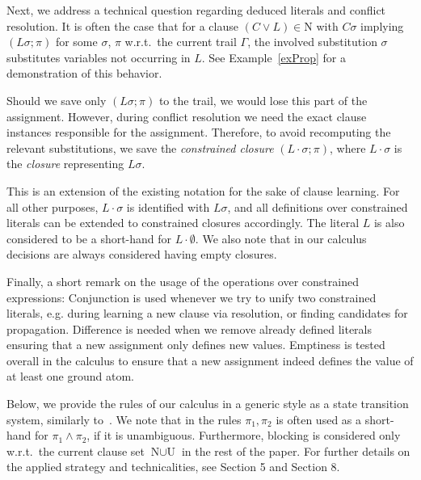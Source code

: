 \documentclass[a4paper]{article}
\begin{document}
Next, we address a technical question regarding deduced literals and conflict resolution. 
It is often the case that for a clause $(C\lor L) \in \text{N}$ with $C\sigma$ implying $(L\sigma; \pi)$ for some $\sigma$, $\pi$ 
w.r.t.\
the current trail $\Gamma$, the involved substitution $\sigma$ substitutes variables not occurring in $L$. 
See Example~\ref{exProp} for a demonstration of this behavior.

Should we save only $(L\sigma; \pi)$ to the trail, we would lose this part of the assignment. 
However, during conflict resolution we need the exact clause instances responsible for the assignment. 
Therefore, to avoid recomputing the relevant substitutions, we save the \emph{constrained closure} $(L\cdot\sigma; \pi)$, where 
$L\cdot\sigma$ is the \emph{closure} representing $L\sigma$. 

This is an extension of the existing notation for the sake of clause learning. 
For all other purposes, $L\cdot\sigma$ is identified with $L\sigma$, and all definitions over constrained literals 
can be extended to constrained closures accordingly.
The literal $L$ is also considered to be a short-hand for $L\cdot\emptyset$.
We also note that in our calculus decisions are always considered having empty closures.

Finally, a short remark on the usage of the operations over constrained expressions:
Conjunction is used whenever we try to unify two constrained literals, 
e.g. during learning a new clause via resolution,
or finding candidates for propagation.
Difference is needed when we remove already defined literals ensuring 
that a new assignment only defines new values.
Emptiness is tested overall in the calculus to ensure that a new assignment 
indeed defines the value of at least one ground atom.

Below, we provide the rules of our calculus in a generic style as a state transition system, 
similarly to~\cite{NieuwenhuisOT04}. 
We note that in the rules $\pi_1, \pi_2$ is often used as a short-hand for $\pi_1 \land \pi_2$, if it is unambiguous.
Furthermore, blocking is considered only w.r.t.\ the current clause set $\text{N}\cup\text{U}$ in the rest of the paper. 
For further details on the applied strategy and technicalities, see Section 5 and Section 8.
\end{document}
